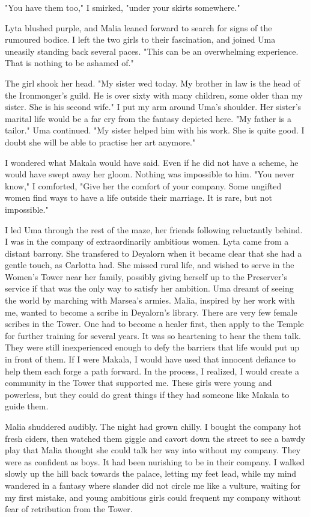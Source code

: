 \documentclass{article}
\begin{document}
"You have them too," I smirked, "under your skirts somewhere."

Lyta blushed purple, and Malia leaned forward to search for signs of the rumoured bodice. I left the two girls to their fascination, and joined Uma uneasily standing back several paces. "This can be an overwhelming experience. That is nothing to be ashamed of."

The girl shook her head. "My sister wed today. My brother in law is the head of the Ironmonger's guild. He is over sixty with many children, some older than my sister. She is his second wife." I put my arm around Uma's shoulder. Her sister's marital life would be a far cry from the fantasy depicted here. "My father is a tailor." Uma continued. "My sister helped him with his work. She is quite good. I doubt she will be able to practise her art anymore."

I wondered what Makala would have said. Even if he did not have a scheme, he would have swept away her gloom. Nothing was impossible to him. "You never know," I comforted, "Give her the comfort of your company. Some ungifted women find ways to have a life outside their marriage. It is rare, but not impossible."

I led Uma through the rest of the maze, her friends following reluctantly behind. I was in the company of extraordinarily ambitious women. Lyta came from a distant barrony. She transfered to Deyalorn when it became clear that she had a gentle touch, as Carlotta had. She missed rural life, and wished to serve in the Women's Tower near her family, possibly giving herself up to the Preserver's service if that was the only way to satisfy her ambition. Uma dreamt of seeing the world by marching with Marsea's armies. Malia, inspired by her work with me, wanted to become a scribe in Deyalorn's library. There are very few female scribes in the Tower. One had to become a healer first, then apply to the Temple for further training for several years. It was so heartening to hear the them talk. They were still inexperienced enough to defy the barriers that life would put up in front of them. If I were Makala, I would have used that innocent defiance to help them each forge a path forward. In the process, I realized, I would create a community in the Tower that supported me. These girls were young and powerless, but they could do great things if they had someone like Makala to guide them.

Malia shuddered audibly. The night had grown chilly. I bought the company hot fresh ciders, then watched them giggle and cavort down the street to see a bawdy play that Malia thought she could talk her way into without my company. They were as confident as boys. It had been nurishing to be in their company. I walked slowly up the hill back towards the palace, letting my feet lead, while my mind wandered in a fantasy where slander did not circle me like a vulture, waiting for my first mistake, and young ambitious girls could frequent my company without fear of retribution from the Tower.
\end{document}
